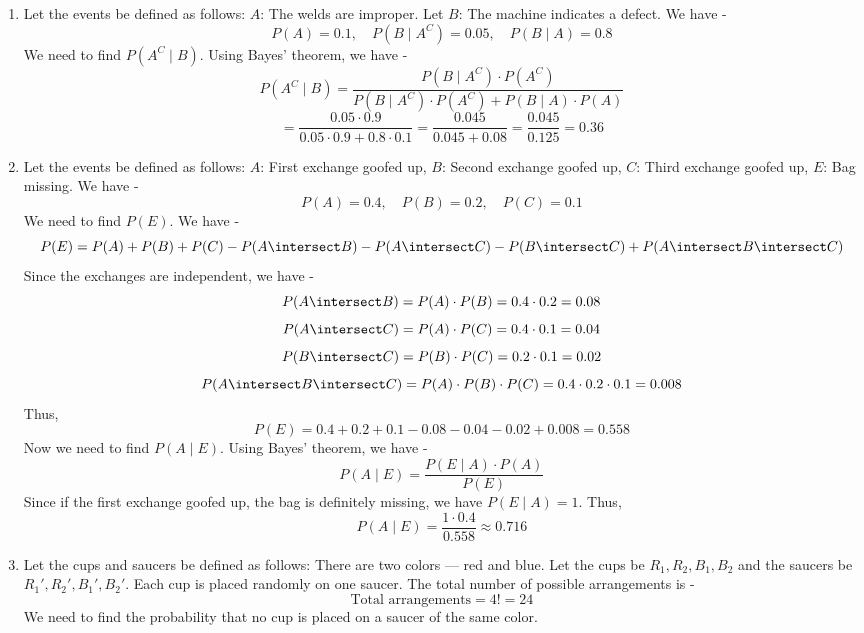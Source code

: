 \begin{enumerate}
\begin{enumerate}
\[{            }\]
            \item We need to find $P(B\mid A^C)$. Using the definition of conditional probability, we have -
            \[\boxed{P(B\mid A^C) = \frac{P(B \setminus A)}{P(A^C)} = \frac{0.35}{0.9} \approx 0.3889
            }\]
        \end{enumerate}
        \item Let the events be defined as follows:
        $A$: The welds are improper. Let $B$: The machine indicates a defect. We have - 
        $$P(A) = 0.1, \quad P(B \mid A^C) = 0.05, \quad P(B \mid A) = 0.8$$
        We need to find $P(A^C \mid B)$. Using Bayes' theorem, we have -
        \[P(A^C \mid B) = \frac{P(B \mid A^C) \cdot P(A^C)}{P(B \mid A^C) \cdot P(A^C) + P(B \mid A) \cdot P(A)}\]
        \[\boxed{= \frac{0.05 \cdot 0.9}{0.05 \cdot 0.9 + 0.8 \cdot 0.1} = \frac{0.045}{0.045 + 0.08} = \frac{0.045}{0.125} = 0.36
        }\]
        \item Let the events be defined as follows:
        $A$: First exchange goofed up, $B$: Second exchange goofed up, $C$: Third exchange goofed up, $E$: Bag missing. We have - 
        $$P(A) = 0.4, \quad P(B) = 0.2, \quad P(C) = 0.1$$
        We need to find $P(E)$. We have -
        \[P(E) = P(A) + P(B) + P(C) - P(A \intersect B) - P(A \intersect C) - P(B \intersect C) + P(A \intersect B \intersect C)\]
        Since the exchanges are independent, we have -
        \[P(A \intersect B) = P(A) \cdot P(B) = 0.4 \cdot 0.2 = 0.08\]
        \[P(A \intersect C) = P(A) \cdot P(C) = 0.4 \cdot 0.1 = 0.04\]
        \[P(B \intersect C) = P(B) \cdot P(C) = 0.2 \cdot 0.1 = 0.02\]
        \[P(A \intersect B \intersect C) = P(A) \cdot P(B) \cdot P(C) = 0.4 \cdot 0.2 \cdot 0.1 = 0.008\]
        Thus,
        \[\boxed{P(E) = 0.4 + 0.2 + 0.1 - 0.08 - 0.04 - 0.02 + 0.008 = 0.558
        }\]
        Now we need to find $P(A \mid E)$. Using Bayes' theorem, we have -
        \[P(A \mid E) = \frac{P(E \mid A) \cdot P(A)}{P(E)}\]
        Since if the first exchange goofed up, the bag is definitely missing, we have $P(E \mid A) = 1$. Thus,
        \[\boxed{P(A \mid E) = \frac{1 \cdot 0.4}{0.558} \approx 0.716
        }\]
        \item Let the cups and saucers be defined as follows:  
              There are two colors — red and blue. 
              Let the cups be $R_1, R_2, B_1, B_2$ and the saucers be $R_1', R_2', B_1', B_2'$. Each cup is placed randomly on one saucer. The total number of possible arrangements is -  
              $$\text{Total arrangements} = 4! = 24$$
              We need to find the probability that no cup is placed on a saucer of the same color.  

\end{enumerate}
